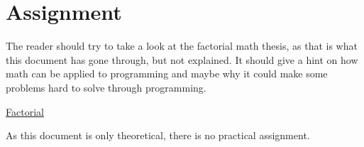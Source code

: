 \section{Assignment}

The reader should try to take a look at the factorial math thesis, as that is what this document has gone through, but not explained. It should give a hint on how math can be applied to programming and maybe why it could make some problems hard to solve through programming.

\href{https://en.wikipedia.org/wiki/Factorial}{Factorial}

As this document is only theoretical, there is no practical assignment.
